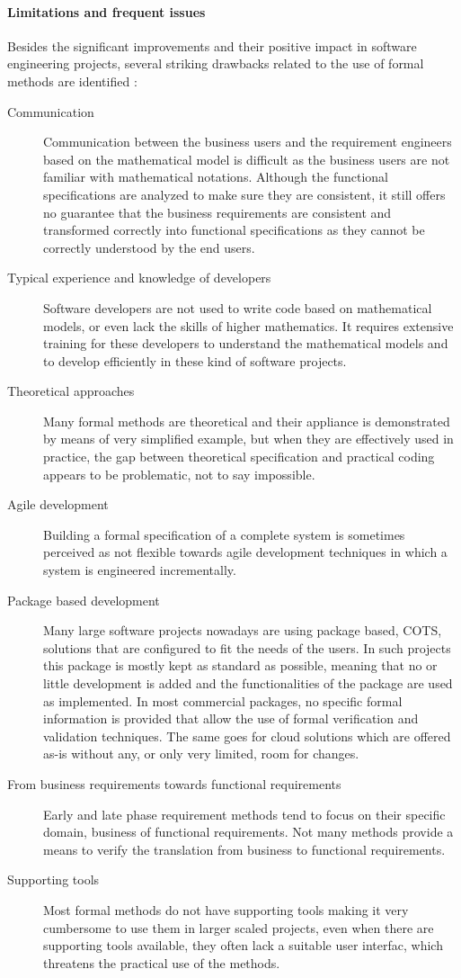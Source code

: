 \paragraph{Limitations and frequent issues}
\label{sec:drawbacks}
Besides the significant improvements and their positive impact in software engineering projects, several striking drawbacks related to the use of formal methods are identified :
\begin{description}
	\item[Communication] Communication between the business users and the requirement engineers based on the mathematical model is difficult as the business users are not familiar with mathematical notations. Although the functional specifications are analyzed to make sure they are consistent, it still offers no guarantee that the business requirements are consistent and transformed correctly into functional specifications as they cannot be correctly understood by the end users.
	\item[Typical experience and knowledge of developers] Software developers are not used to write code based on mathematical models, or even lack the skills of higher mathematics. It requires extensive training for these developers to understand the mathematical models and to develop efficiently in these kind of software projects.
	\item[Theoretical approaches] Many formal methods are theoretical and their appliance is demonstrated by means of very simplified example, but when they are effectively used in practice, the gap between theoretical specification and practical coding appears to be problematic, not to say impossible.
	\item[Agile development] Building a formal specification of a complete system is sometimes perceived as not flexible towards agile development techniques in which a system is engineered incrementally. 
	\item[Package based development] Many large software projects nowadays are using package based, COTS, solutions that are configured to fit the needs of the users. In such projects this package is mostly kept as standard as possible, meaning that no or little development is added and the functionalities of the package are used as implemented. In most commercial packages, no specific formal information is provided that allow the use of formal verification and validation techniques. The same goes for cloud solutions which are offered as-is without any, or only very limited, room for changes.
	\item[From business requirements towards functional requirements]Early and late phase requirement methods tend to focus on their specific domain, business of functional requirements.
	Not many methods provide a means to verify the translation from business to functional requirements.
	\item[Supporting tools] Most formal methods do not have supporting tools making it very cumbersome to use them in larger scaled projects, even when there are supporting tools available, they often lack a suitable user interfac, which threatens the practical use of the methods.


\end{description}
